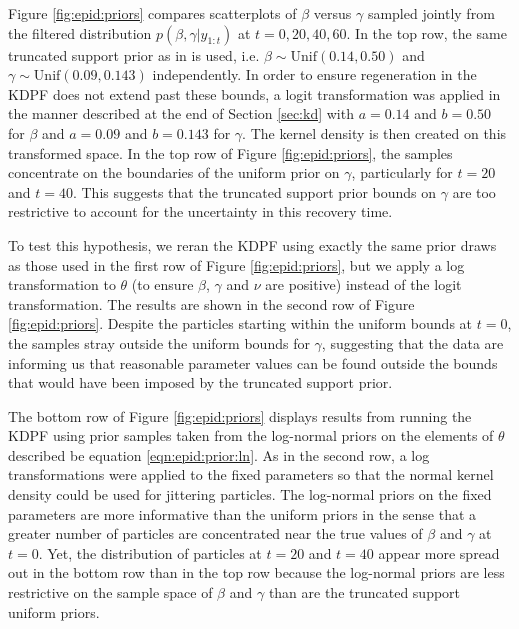 Figure \ref{fig:epid:priors} compares scatterplots of $\beta$ versus $\gamma$ sampled jointly from the filtered distribution $p(\beta,\gamma|y_{1:t})$ at $t = 0, 20, 40, 60$. In the top row, the same truncated support prior as in \citet{skvortsov2012monitoring} is used, i.e. $\beta \sim \mbox{Unif}( 0.14, 0.50)$ and $\gamma \sim \mbox{Unif}(0.09, 0.143)$ independently. In order to ensure regeneration in the KDPF does not extend past these bounds, a logit transformation was applied in the manner described at the end of Section \ref{sec:kd} with $a = 0.14$ and $b = 0.50$ for $\beta$ and $a = 0.09$ and $b = 0.143$ for $\gamma$. The kernel density is then created on this transformed space. In the top row of Figure \ref{fig:epid:priors}, the samples concentrate on the boundaries of the uniform prior on $\gamma$, particularly for $t = 20$ and $t = 40$. This suggests that the truncated support prior bounds on $\gamma$ are too restrictive to account for the uncertainty in this recovery time.

To test this hypothesis, we reran the KDPF using exactly the same prior draws as those used in the first row of Figure \ref{fig:epid:priors}, but we apply a log transformation to $\theta$ (to ensure $\beta$, $\gamma$ and $\nu$ are positive) instead of the logit transformation. The results are shown in the second row of Figure \ref{fig:epid:priors}. Despite the particles starting within the uniform bounds at $t=0$, the samples stray outside the uniform bounds for $\gamma$, suggesting that the data are informing us that reasonable parameter values can be found outside the bounds that would have been imposed by the truncated support prior.

The bottom row of Figure \ref{fig:epid:priors} displays results from running the KDPF using prior samples taken from the log-normal priors on the elements of $\theta$ described be equation \eqref{eqn:epid:prior:ln}. As in the second row, a log transformations were applied to the fixed parameters so that the normal kernel density could be used for jittering particles. The log-normal priors on the fixed parameters are more informative than the uniform priors in the sense that a greater number of particles are concentrated near the true values of $\beta$ and $\gamma$ at $t = 0$. Yet, the distribution of particles at $t = 20$ and $t = 40$ appear more spread out in the bottom row than in the top row because the log-normal priors are less restrictive on the sample space of $\beta$ and $\gamma$ than are the truncated support uniform priors.

